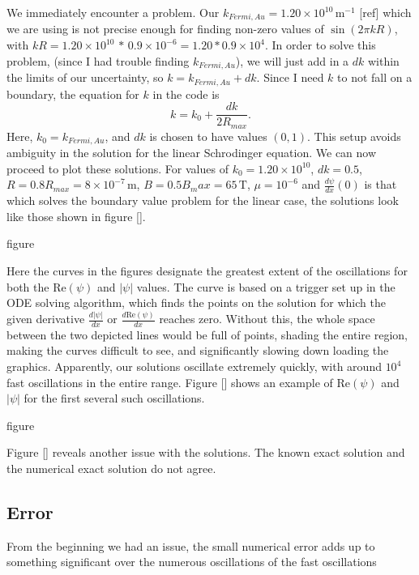 \documentclass[A4,12pt,oneside]{article}
\renewcommand{\(}{\left(}
\renewcommand{\)}{\right)}
\renewcommand{\Re}{\mathrm{Re}}
\begin{document}
We immediately encounter a problem. Our $k_{Fermi, Au} = 1.20 \times 10^{10} \, \mathrm{m}^{-1}$ [ref] which we are using is not precise enough for finding non-zero values of $\sin\left(2\pi k R\right)$, with $kR = 1.20 \times 10^{10}\, *\, 0.9 \times 10^{-6} = 1.20 * 0.9 \times 10^{4}$. In order to solve this problem, (since I had trouble finding $k_{Fermi, Au}$), we will just add in a $dk$ within the limits of our uncertainty, so $k = k_{Fermi, Au} + dk$. Since I need $k$ to not fall on a boundary, the equation for $k$ in the code is
\begin{equation}
k = k_0 + \frac{dk}{2 R_{max}}.
\end{equation}
Here, $k_0 = k_{Fermi, Au}$, and $dk$ is chosen to have values $(0, 1)$. This setup avoids ambiguity in the solution for the linear Schrodinger equation. We can now proceed to plot these solutions. For values of $k_0 = 1.20 \times 10^{10}$,  $dk = 0.5$, $R = 0.8 R_{max} = 8 \times 10^{-7} \, \mathrm{m}$,  $B = 0.5 B_max = 65 \, \mathrm{T}$, $\mu = 10^{-6}$ and $\frac{d\psi}{dx}\left(0\right)$ is that which solves the boundary value problem for the linear case,  the solutions look like those shown in figure [].

figure 

Here the curves in the figures designate the greatest extent of the oscillations for both the $\Re\left(\psi\right)$ and $\left|\psi\right|$ values. The curve is based on a trigger set up in the ODE solving algorithm, which finds the points on the solution for which the given derivative $\frac{d\left|\psi\right|}{dx}$ or $\frac{d\Re\left(\psi\right)}{dx}$ reaches zero. Without this, the whole space between the two depicted lines would be full of points, shading the entire region, making the curves difficult to see, and significantly slowing down loading the graphics. Apparently, our solutions oscillate extremely quickly, with around $10^4$ fast oscillations in the entire range. Figure [] shows an example of $\Re\left(\psi\right)$ and $\left|\psi\right|$ for the first several such oscillations.

figure

Figure [] reveals another issue with the solutions. The known exact solution and the numerical exact solution do not agree. 


\subsection{Error}
From the beginning we had an issue, the small numerical error adds up to something significant over the numerous oscillations of the fast oscillations
\end{document}
